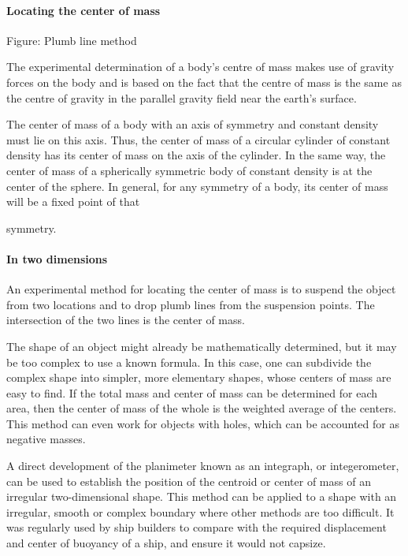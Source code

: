 \paragraph{Locating the center of mass}






Figure: Plumb line method



The experimental determination of a body's centre of mass makes use of gravity forces on the body and is based on the fact that the centre of mass is the same as the centre of gravity in the parallel gravity field near the earth's surface.



The center of mass of a body with an axis of symmetry and constant density must lie on this axis. Thus, the center of mass of a circular cylinder of constant density has its center of mass on the axis of the cylinder. In the same way, the center of mass of a spherically symmetric body of constant density is at the center of the sphere. In general, for any symmetry of a body, its center of mass will be a fixed point of that

symmetry.



\paragraph{In two dimensions}



An experimental method for locating the center of mass is to suspend the object from two locations and to drop plumb lines from the suspension points. The intersection of the two lines is the center of mass.



The shape of an object might already be mathematically determined, but it may be too complex to use a known formula. In this case, one can subdivide the complex shape into simpler, more elementary shapes, whose centers of mass are easy to find. If the total mass and center of mass can be determined for each area, then the center of mass of the whole is the weighted average of the centers. This method can even work for objects with holes, which can be accounted for as negative masses.



A direct development of the planimeter known as an integraph, or integerometer, can be used to establish the position of the centroid or center of mass of an irregular two-dimensional shape. This method can be applied to a shape with an irregular, smooth or complex boundary where other methods are too difficult. It was regularly used by ship builders to compare with the required displacement and center of buoyancy of a ship, and ensure it would not capsize.



